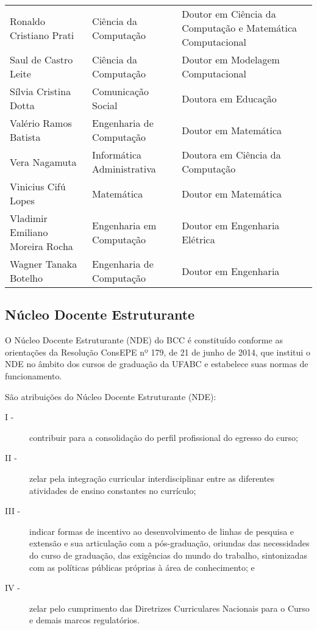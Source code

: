 {\begin{longtable}{|p{}|p{}|p{}|}
    Ronaldo Cristiano Prati & Ciência da Computação & Doutor em Ciência da Computação e Matemática Computacional \\
    Saul de Castro Leite & Ciência da Computação & Doutor em Modelagem Computacional \\
    Sílvia Cristina Dotta & Comunicação Social & Doutora em Educação \\
    Valério Ramos Batista & Engenharia de Computação & Doutor em Matemática \\
    Vera Nagamuta & Informática Administrativa & Doutora em Ciência da Computação \\
    Vinicius Cifú Lopes & Matemática & Doutor em Matemática \\
    Vladimir Emiliano Moreira Rocha & Engenharia em Computação & Doutor em Engenharia Elétrica \\
    Wagner Tanaka Botelho & Engenharia de Computação & Doutor em Engenharia \\
    \hline
\end{longtable}
}


\subsection{Núcleo Docente Estruturante}

O Núcleo Docente Estruturante (NDE) do BCC é constituído conforme as
orientações da Resolução ConsEPE nº 179, de 21 de junho de 2014, que institui o
NDE no âmbito dos cursos de graduação da UFABC e estabelece suas normas de
funcionamento. 

São atribuições do Núcleo Docente Estruturante (NDE):
\begin{description}
    \item[I -] contribuir para a consolidação do perfil profissional do egresso
    do curso;
    \item[II -] zelar pela integração curricular interdisciplinar entre as
    diferentes atividades de ensino constantes no currículo;
    \item[III -] indicar formas de incentivo ao desenvolvimento de linhas de
    pesquisa e extensão e sua articulação com a pós-graduação, oriundas das
    necessidades do curso de graduação, das exigências do mundo do trabalho,
    sintonizadas com as políticas públicas próprias à área de conhecimento; e
    \item[IV -] zelar pelo cumprimento das Diretrizes Curriculares Nacionais
    para o Curso e demais marcos regulatórios.
\end{description}

